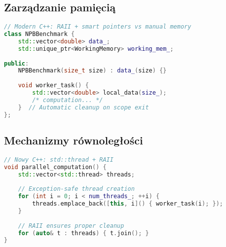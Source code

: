 \subsection{Zarządzanie pamięcią}
\begin{lstlisting}[language=C++, style=VS2017,  caption={Implementacja nowoczesnego C++ - zarządzanie pamięcią}, label={lst:modern-cpp-memory}]
// Modern C++: RAII + smart pointers vs manual memory
class NPBBenchmark {
    std::vector<double> data_;                    
    std::unique_ptr<WorkingMemory> working_mem_;  
    
public:
    NPBBenchmark(size_t size) : data_(size) {}   
    
    void worker_task() {
        std::vector<double> local_data(size_);
        /* computation... */
    }  // Automatic cleanup on scope exit
};
\end{lstlisting}

\subsection{Mechanizmy równoległości}
\begin{lstlisting}[language=C++, style=VS2017,  caption={Implementacja nowoczesnego C++ - równoległość}, label={lst:modern-cpp-parallelism}]
// Nowy C++: std::thread + RAII
void parallel_computation() {
    std::vector<std::thread> threads;
    
    // Exception-safe thread creation
    for (int i = 0; i < num_threads_; ++i) {
        threads.emplace_back([this, i]() { worker_task(i); });
    }
    
    // RAII ensures proper cleanup
    for (auto& t : threads) { t.join(); }
}
\end{lstlisting}

